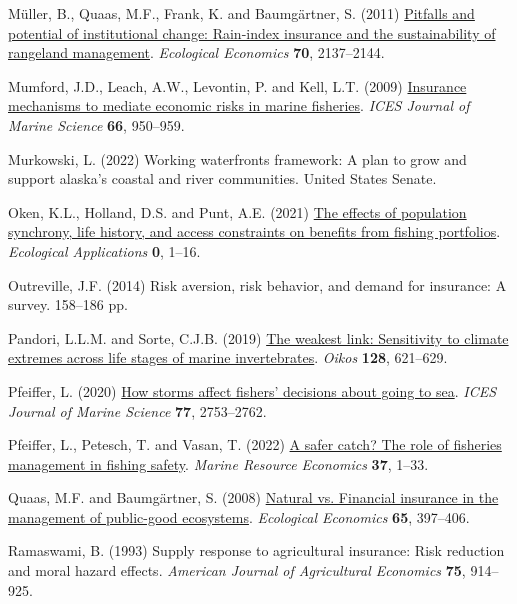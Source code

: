 \documentclass[
  letterpaper,
  DIV=11,
  numbers=noendperiod]{scrartcl}
\newlength{\cslhangindent}
\newenvironment{CSLReferences}[2] %
 {\begin{list}{}{%
  \setlength{\itemindent}{0pt}
  \setlength{\leftmargin}{0pt}
  \setlength{\parsep}{0pt}
  \ifodd #1
   \setlength{\leftmargin}{\cslhangindent}
   \setlength{\itemindent}{-1\cslhangindent}
  \fi
  \setlength{\itemsep}{#2\baselineskip}}}
 {\end{list}}
\theoremstyle{plain}
\theoremstyle{plain}
\theoremstyle{remark}
\begin{document}
\begin{CSLReferences}{1}{0}
Müller, B., Quaas, M.F., Frank, K. and Baumgärtner, S. (2011)
\href{https://doi.org/10.1016/j.ecolecon.2011.06.011}{Pitfalls and
potential of institutional change: Rain-index insurance and the
sustainability of rangeland management}. \emph{Ecological Economics}
\textbf{70}, 2137--2144.

Mumford, J.D., Leach, A.W., Levontin, P. and Kell, L.T. (2009)
\href{https://doi.org/10.1093/icesjms/fsp100}{Insurance mechanisms to
mediate economic risks in marine fisheries}. \emph{ICES Journal of
Marine Science} \textbf{66}, 950--959.

Murkowski, L. (2022) Working waterfronts framework: A plan to grow and
support alaska's coastal and river communities. United States Senate.

Oken, K.L., Holland, D.S. and Punt, A.E. (2021)
\href{https://doi.org/10.1002/eap.2307}{The effects of population
synchrony, life history, and access constraints on benefits from fishing
portfolios}. \emph{Ecological Applications} \textbf{0}, 1--16.

Outreville, J.F. (2014) Risk aversion, risk behavior, and demand for
insurance: A survey. 158--186 pp.

Pandori, L.L.M. and Sorte, C.J.B. (2019)
\href{https://doi.org/10.1111/oik.05886}{The weakest link: Sensitivity
to climate extremes across life stages of marine invertebrates}.
\emph{Oikos} \textbf{128}, 621--629.

Pfeiffer, L. (2020) \href{https://doi.org/10.1093/icesjms/fsaa145}{How
storms affect fishers' decisions about going to sea}. \emph{ICES Journal
of Marine Science} \textbf{77}, 2753--2762.

Pfeiffer, L., Petesch, T. and Vasan, T. (2022)
\href{https://doi.org/10.1086/716856}{A safer catch? The role of
fisheries management in fishing safety}. \emph{Marine Resource
Economics} \textbf{37}, 1--33.

Quaas, M.F. and Baumgärtner, S. (2008)
\href{https://doi.org/10.1016/j.ecolecon.2007.07.004}{Natural vs.
Financial insurance in the management of public-good ecosystems}.
\emph{Ecological Economics} \textbf{65}, 397--406.

Ramaswami, B. (1993) Supply response to agricultural insurance: Risk
reduction and moral hazard effects. \emph{American Journal of
Agricultural Economics} \textbf{75}, 914--925.


\end{CSLReferences}
\end{document}
